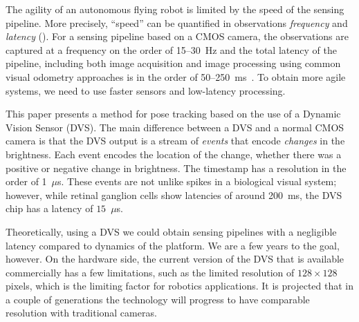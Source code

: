 The agility of an autonomous flying robot is limited by the speed
of the sensing pipeline. More precisely, ``speed'' can be quantified
in observations\emph{ frequency} and \emph{latency} ().
For a sensing pipeline based on a CMOS camera, the observations are
captured at a frequency on the order of 15--30~Hz and the total latency
of the pipeline, including both image acquisition and image processing
using common visual odometry approaches is in the order of 50--250~ms~\cite{Weiss2011}.
To obtain more agile systems, we need to use faster sensors and low-latency
processing.

This paper presents a method for pose tracking based on the use of
a Dynamic Vision Sensor (DVS). The main difference between a DVS and
a normal CMOS camera is that the DVS output is a stream of \emph{events}
that encode \emph{changes} in the brightness. Each event encodes
the location of the change, whether there was a positive or negative
change in brightness. The timestamp has a resolution in the order
of 1~$\mu$s.  These events are not unlike spikes in a biological
visual system; however, while retinal ganglion cells show latencies
of around 200~ms, the DVS chip has a latency of $15$~$\mu$s.

Theoretically, using a DVS we could obtain sensing pipelines with
a negligible latency compared to dynamics of the platform. We are
a few years to the goal, however. On the hardware side, the current
version of the DVS that is available commercially has a few limitations,
such as the limited resolution of $128\times128$ pixels, which is
the limiting factor for robotics applications.  It is projected
that in a couple of generations the technology will progress to have
comparable resolution with traditional cameras.

